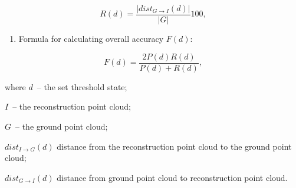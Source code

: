 \documentclass[9pt,a4paper,twoside]{tau}
\begin{document}
\begin{equation} \label{ec:equationn}
            R(d)=\frac{\left|\mathit{dist}_{G\rightarrow I}\left(d\right)\right|}{\left|G\right|}100,
	\end{equation}

 \begin{enumerate}[resume*=listWWNumxv]
\item 
Formula for calculating overall accuracy  $F\left(d\right)$:
\end{enumerate}

\begin{equation} \label{ec:equationnn}
            F\left(d\right)=\frac{2P\left(d\right)R\left(d\right)}{P\left(d\right)+R\left(d\right)},
	\end{equation}

{where } $d${\ – the set threshold state;}

 $I$\ – the reconstruction point cloud;

 $G$\ – the ground point cloud;

 $\mathit{dist}_{I\rightarrow G}\left(d\right)$ distance from the reconstruction point cloud to
the ground point cloud;

 $\mathit{dist}_{G\rightarrow I}\left(d\right)$ distance from ground
point cloud to reconstruction point cloud.
\end{document}
